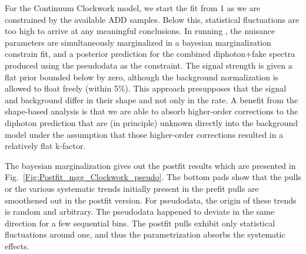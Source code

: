 For the Continuum Clockwork model, we start the fit from 1 \TeV as we are constrained by the available ADD samples. Below this, statistical fluctuations are too high to arrive at any meaningful conclusions. In running \THETA, the nuisance parameters are simultaneously marginalized in a bayesian marginalization constrain fit, and a posterior prediction for the combined diphoton+fake \mgg spectra produced using the pseudodata as the constraint. The signal strength is given a flat prior bounded below by zero, although the background normalization is allowed to float freely (within 5\%). This approach presupposes that the signal and background differ in their shape and not only in the rate. A benefit from the shape-based analysis is that we are able to absorb higher-order corrections to the diphoton prediction that are (in principle) unknown directly into the background model under the assumption that those higher-order corrections resulted in a relatively flat k-factor. 

The bayesian marginalization gives out the postfit results which are presented in Fig.~\ref{Fig:Postfit_mgg_Clockwork_pseudo}. The bottom pads show that the pulls or the various systematic trends initially present in the prefit pulls are smoothened out in the postfit version. For pseudodata, the origin of these trends is random and arbitrary. The pseudodata happened to deviate in the same direction for a few sequential bins. The postfit pulls exhibit only statistical fluctuations around one, and thus the \mgg parametrization absorbs the systematic effects. 

 

